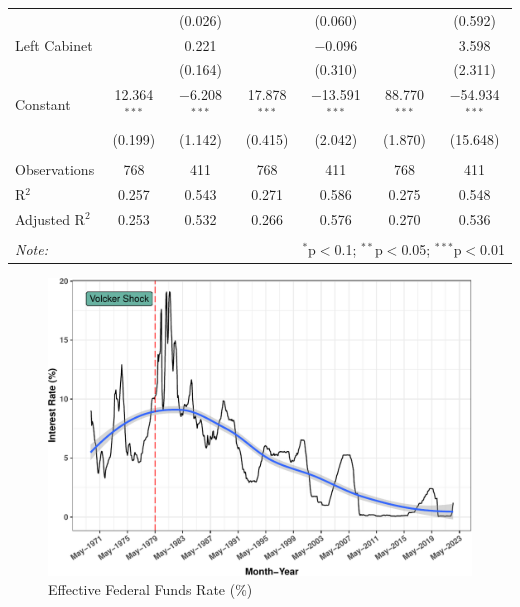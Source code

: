 \documentclass[
  11pt,
]{article}
\begin{document}
\begin{table}[!htbp]
\begin{tabular}{@{\extracolsep{5pt}}lcccccc}
  &  & (0.026) &  & (0.060) &  & (0.592) \\ 
  Left Cabinet &  & 0.221 &  & $-$0.096 &  & 3.598 \\ 
  &  & (0.164) &  & (0.310) &  & (2.311) \\ 
  Constant & 12.364$^{***}$ & $-$6.208$^{***}$ & 17.878$^{***}$ & $-$13.591$^{***}$ & 88.770$^{***}$ & $-$54.934$^{***}$ \\ 
  & (0.199) & (1.142) & (0.415) & (2.042) & (1.870) & (15.648) \\ 
 \hline \\[-1.8ex] 
Observations & 768 & 411 & 768 & 411 & 768 & 411 \\ 
R$^{2}$ & 0.257 & 0.543 & 0.271 & 0.586 & 0.275 & 0.548 \\ 
Adjusted R$^{2}$ & 0.253 & 0.532 & 0.266 & 0.576 & 0.270 & 0.536 \\ 
\hline 
\hline \\[-1.8ex] 
\textit{Note:}  & \multicolumn{6}{r}{$^{*}$p$<$0.1; $^{**}$p$<$0.05; $^{***}$p$<$0.01} \\ 
\end{tabular} 
\end{table}

\begin{figure}[ht]

{\centering \includegraphics{fed-paper-drafting_files/figure-latex/fed_funds-1} 

}

\caption{\label{fed_funds_rate}Effective Federal Funds Rate (\%)}\label{fig:fed_funds}
\end{figure}
\end{document}
